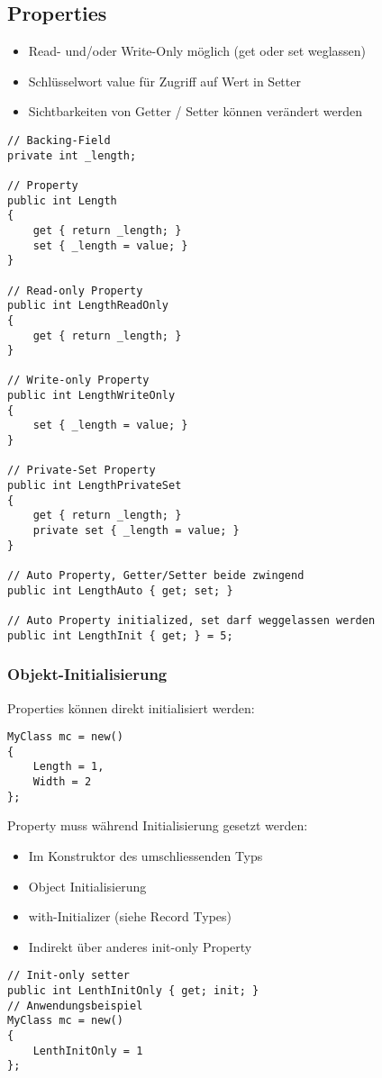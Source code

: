 \begin{multicols*}{2}
\subsection{Properties}
\begin{itemize}
    \item Read- und/oder Write-Only möglich (get oder set weglassen)
    \item Schlüsselwort value für Zugriff auf Wert in Setter
    \item Sichtbarkeiten von Getter / Setter können verändert werden
\end{itemize}
\begin{lstlisting}
// Backing-Field
private int _length;

// Property
public int Length 
{
    get { return _length; }
    set { _length = value; }
}

// Read-only Property
public int LengthReadOnly
{
    get { return _length; }
}

// Write-only Property
public int LengthWriteOnly
{
    set { _length = value; }
}

// Private-Set Property
public int LengthPrivateSet
{
    get { return _length; }
    private set { _length = value; }
}

// Auto Property, Getter/Setter beide zwingend
public int LengthAuto { get; set; }

// Auto Property initialized, set darf weggelassen werden
public int LengthInit { get; } = 5;
\end{lstlisting}
\subsubsection{Objekt-Initialisierung}
\label{sec:object_initialisation}
Properties können direkt initialisiert werden:
\begin{lstlisting}
MyClass mc = new()
{
    Length = 1,
    Width = 2 
};
\end{lstlisting}
 Property muss während Initialisierung gesetzt werden:
\begin{itemize}
    \item Im Konstruktor des umschliessenden Typs
    \item Object Initialisierung
    \item with-Initializer (siehe Record Types)
    \item Indirekt über anderes init-only Property
\end{itemize}
\begin{lstlisting}
// Init-only setter
public int LenthInitOnly { get; init; }
// Anwendungsbeispiel
MyClass mc = new()
{
    LenthInitOnly = 1 
};
\end{lstlisting}


\end{multicols*}
